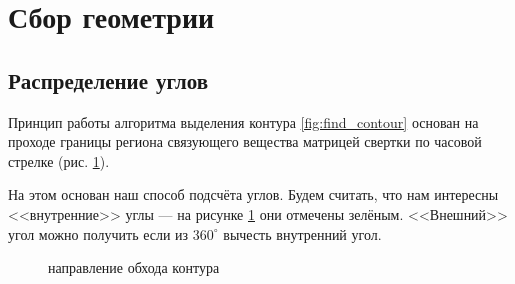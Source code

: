 \documentclass[a4paper, 14pt]{article}
\begin{document}
	 \newpage
	 \section{Сбор геометрии}
	 
	 \subsection{Распределение углов}
	 
	 Принцип работы алгоритма выделения контура \ref{fig:find_contour} основан на проходе границы региона связующего вещества матрицей свертки по часовой стрелке (рис. \ref{clock}).
	 
	 На этом основан наш способ подсчёта углов. Будем считать, что нам интересны <<внутренние>> углы --- на рисунке \ref{clock} они отмечены зелёным. <<Внешний>> угол можно получить если из $360^\circ$ вычесть внутренний угол.
	 
	 
	 
	  \begin{figure}[h]
	 	\caption{направление обхода контура}
	 	\label{clock}
	 \end{figure}
	 
\end{document}
